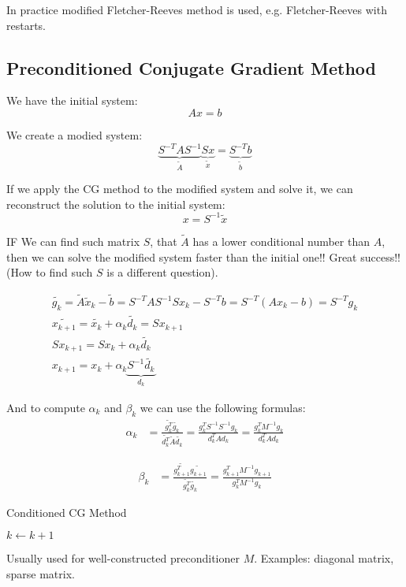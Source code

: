 In practice modified Fletcher-Reeves method is used, e.g. Fletcher-Reeves with restarts.

\subsection{Preconditioned Conjugate Gradient Method}

We have the initial system: 
\[ 
    A x = b
\] 

We create a modied system:
\[ 
    \underbrace{S^{-T} A S^{-1}}_{\tilde{A}} \underbrace{S x}_{\tilde{x}} = \underbrace{S^{-T} b}_{\tilde{b}}
\] 

If we apply the CG method to the modified system and solve it, we can reconstruct the solution to the initial system: 
\[ 
    x = S^{-1} \tilde{x}
\] 

IF\! We can find such matrix $S$, that $\tilde{A}$ has a lower conditional number than $A$, then we can solve the modified system faster than the initial one!! Great success!! (How to find such $S$ is a different question).

\begin{gather*}
    \tilde{g_k} = \tilde{A} \tilde{x}_k - \tilde{b} = S^{-T} A S^{-1} S x_k - S^{-T} b = S^{-T} (A x_k - b) = S^{-T} g_k \\
    \tilde{x_{k+1}} = \tilde{x_k} + \alpha_k \tilde{d_k} = S x_{k+1} \\
    S x_{k+1} = S x_k + \alpha_k \tilde{d_k} \\
    x_{k+1} = x_k + \alpha_k \underbrace{S^{-1} \tilde{d_k}}_{d_k}
\end{gather*}

And to compute $\alpha_k$ and $\beta_k$ we can use the following formulas:
\begin{align*}
    \alpha_k &= \frac{\tilde{g_k^T}\tilde{g_k}}{\tilde{d_k^T} \tilde{A} \tilde{d_k}} = \frac{g_k^T S^{-1} S^{-1} g_k}{d_k^T A d_k} =\boxed{\frac{g_k^T M^{-1} g_k}{d_k^T A d_k}} 
\end{align*}

\begin{align*}
    \beta_k &= \frac{\tilde{g_{k+1}^T} \tilde{g_{k+1}}}{\tilde{g_k^T} \tilde{g_k}} = \boxed{\frac{g_{k+1}^T M^{-1} g_{k+1}}{g_k^T M^{-1} g_k}}
\end{align*}

\begin{algorithm}
    \caption{Conditioned CG Method}
    \begin{algorithmic}[1]
        \State $k \gets k + 1$
    \EndWhile
    \end{algorithmic}
\end{algorithm}

\notice \; Usually used for well-constructed preconditioner $M$. Examples: diagonal matrix, sparse matrix. 
